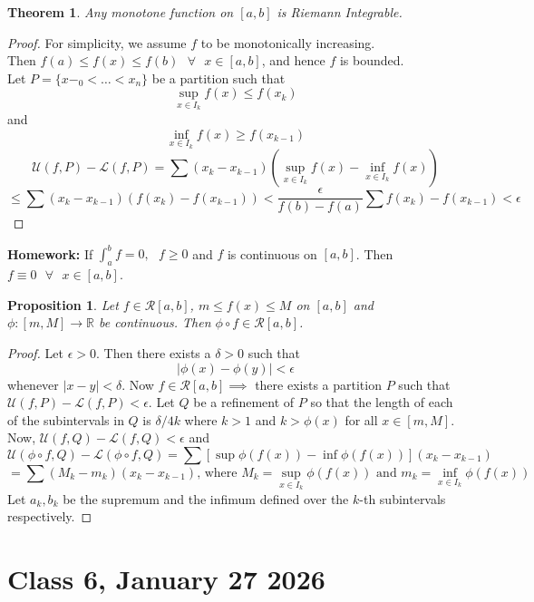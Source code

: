 \documentclass{article}
\newtheorem{theorem}{Theorem}
\newtheorem{proposition}{Proposition}
\begin{document}
\begin{theorem}
Any monotone function on $[a,b]$ is Riemann Integrable.
\end{theorem}
\begin{proof}
For simplicity, we assume $f$ to be monotonically increasing. \\
Then $f(a)\leq f(x)\leq f(b) \text{ }\forall \text{ }x\in [a,b]$, and hence $f$ is bounded. \\
Let $P=\{x-_0<\dots<x_n\}$ be a partition such that $$\sup_{x\in I_k}f(x)\leq f(x_k)$$
and $$\inf_{x\in I_k}f(x)\geq f(x_{k-1})$$
$$\mathcal{U}(f,P)-\mathcal{L}(f,P)=\sum(x_k-x_{k-1})(\sup_{x\in I_k}f(x)-\inf_{x\in I_k}f(x))$$
$$\leq \sum (x_k-x_{k-1})(f(x_k)-f(x_{k-1}))<\frac{\epsilon}{f(b)-f(a)}\sum f(x_k)-f(x_{k-1})<\epsilon$$
\end{proof}
\textbf{Homework:} If $\int_a^b f=0,\text{ }f\geq 0$ and $f$ is continuous on $[a,b]$. Then $f\equiv 0 \text{ }\forall\text{ }x\in [a,b]$.
\begin{proposition}
Let $f\in\mathcal{R}[a,b]$, $m\leq f(x)\leq M$ on $[a,b]$ and $\phi :[m,M]\to\mathbb{R}$ be continuous. Then $\phi\circ f\in \mathcal{R}[a,b]$.
\end{proposition}
\begin{proof}
Let $\epsilon>0$. Then there exists a $\delta >0$ such that 
$$|\phi(x)-\phi(y)|<\epsilon$$
whenever $|x-y|<\delta$. Now $f\in\mathcal{R}[a,b]\implies$ there exists a partition $P$ such that $\mathcal{U}(f,P)-\mathcal{L}(f,P)<\epsilon$. Let 
$Q$ be a refinement of $P$ so that the length of each of the subintervals in $Q$ is $\delta/4k$ where $k>1$ and $k>\phi(x)$ for all $x\in[m,M]$.
Now, $\mathcal{U}(f,Q)-\mathcal{L}(f,Q)<\epsilon$ and 
$$\mathcal{U}(\phi\circ f,Q)-\mathcal{L}(\phi\circ f,Q)=\sum[\sup \phi(f(x))-\inf \phi(f(x))](x_k-x_{k-1})$$
$$=\sum (M_k - m_k)(x_k-x_{k-1})\text{, where }M_k=\sup_{x\in I_k}\phi(f(x))\text{ and }m_k=\inf_{x\in I_k}\phi(f(x))$$
Let $a_k,b_k$ be the supremum and the infimum defined over the $k$-th subintervals respectively. 


\end{proof}
\section*{Class 6, January 27 2026}
\end{document}
